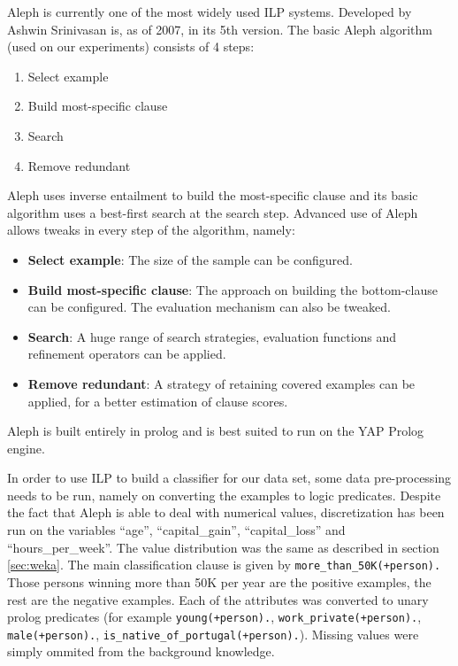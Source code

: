 \documentclass[a4paper]{llncs}
\begin{document}
Aleph \cite{aleph} is currently one of the most widely used ILP \cite{ilp} 
systems. Developed by Ashwin Srinivasan is, as of 2007, in its 5th version. The
basic Aleph algorithm (used on our experiments) consists of 4 steps:

\begin{enumerate}
    \item{Select example}
    \item{Build most-specific clause}
    \item{Search}
    \item{Remove redundant}
\end{enumerate}

Aleph uses inverse entailment to build the most-specific clause and its basic
algorithm uses a best-first search at the search step. Advanced use of Aleph 
allows tweaks in every step of the algorithm, namely:

\begin{itemize}
    \item{\textbf{Select example}: The size of the sample can be configured.}
    \item{\textbf{Build most-specific clause}: The approach on building the 
    bottom-clause can be configured. The evaluation mechanism can also be 
    tweaked.}
    \item{\textbf{Search}: A huge range of search strategies, evaluation 
    functions and refinement operators can be applied.}
    \item{\textbf{Remove redundant}: A strategy of retaining covered examples
    can be applied, for a better estimation of clause scores.}
\end{itemize}

Aleph is built entirely in prolog and is best suited to run on the YAP Prolog 
engine. 

In order to use ILP to build a classifier for our data set, some data
pre-processing needs to be run, namely on converting the examples to logic 
predicates. Despite the fact that Aleph is able to deal with numerical values,
discretization has been run on the variables ``age'', ``capital\_gain'', 
``capital\_loss'' and ``hours\_per\_week''. The value distribution was the same
as described in section \ref{sec:weka}. The main classification clause is given
by \verb$more_than_50K(+person).$ Those persons winning more than 50K per year
are the positive examples, the rest are the negative examples. Each of the
attributes was converted to unary prolog predicates (for example 
\verb$young(+person).$, \verb$work_private(+person).$, \verb$male(+person).$,
\verb$is_native_of_portugal(+person).$). Missing values were simply ommited from
the background knowledge.
\end{document}
